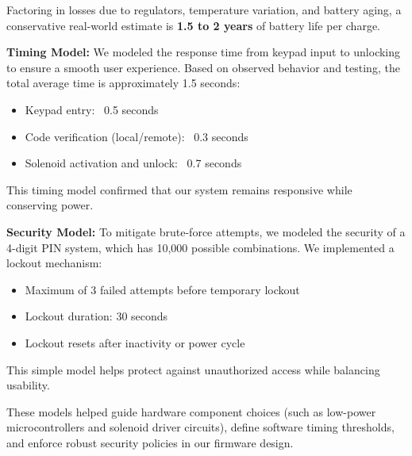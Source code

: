 Factoring in losses due to regulators, temperature variation, and battery aging, a conservative real-world estimate is \textbf{1.5 to 2 years} of battery life per charge.

\textbf{Timing Model:}  
We modeled the response time from keypad input to unlocking to ensure a smooth user experience. Based on observed behavior and testing, the total average time is approximately 1.5 seconds:
\begin{itemize}
    \item Keypad entry: ~0.5 seconds
    \item Code verification (local/remote): ~0.3 seconds
    \item Solenoid activation and unlock: ~0.7 seconds
\end{itemize}

This timing model confirmed that our system remains responsive while conserving power.

\textbf{Security Model:}  
To mitigate brute-force attempts, we modeled the security of a 4-digit PIN system, which has 10,000 possible combinations. We implemented a lockout mechanism:
\begin{itemize}
    \item Maximum of 3 failed attempts before temporary lockout
    \item Lockout duration: 30 seconds
    \item Lockout resets after inactivity or power cycle
\end{itemize}

This simple model helps protect against unauthorized access while balancing usability.

These models helped guide hardware component choices (such as low-power microcontrollers and solenoid driver circuits), define software timing thresholds, and enforce robust security policies in our firmware design.




